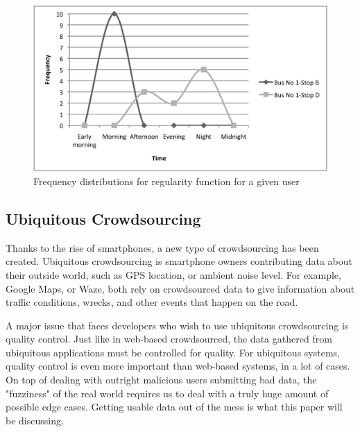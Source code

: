 \documentclass{sig-alternate-05-2015}
\begin{document}
	\begin{figure}
		\includegraphics[width=\linewidth]{freq-dist}
		\caption{Frequency distributions for regularity function for a given user}
		\label{fig-freq}
	\end{figure}
	\subsection{Ubiquitous Crowdsourcing}
	Thanks to the rise of smartphones, a new type of crowdsourcing has been created. Ubiquitous crowdsourcing is smartphone owners contributing data about their outside world, such as GPS location, or ambient noise level. For example, Google Maps, or Waze, both rely on crowdsourced data to give information about traffic conditions, wrecks, and other events that happen on the road. 
	
	A major issue that faces developers who wish to use ubiquitous crowdsourcing is quality control. Just like in web-based crowdsourced, the data gathered from ubiquitous applications must be controlled for quality. For ubiquitous systems, quality control is even more important than web-based systems, in a lot of cases. On top of dealing with outright malicious users submitting bad data, the "fuzziness" of the real world requires us to deal with a truly huge amount of possible edge cases. Getting usable data out of the mess is what this paper will be discussing.
\end{document}
